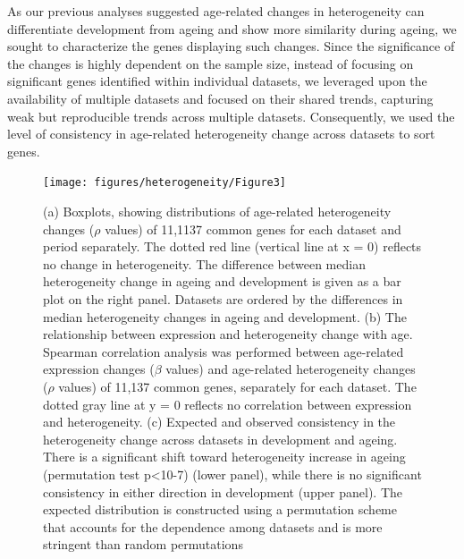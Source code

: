 \documentclass[12pt,twoside]{unicam}
\begin{document}
As our previous analyses suggested age-related changes in heterogeneity can differentiate development from ageing and show more similarity during ageing, we sought to characterize the genes displaying such changes. Since the significance of the changes is highly dependent on the sample size, instead of focusing on significant genes identified within individual datasets, we leveraged upon the availability of multiple datasets and focused on their shared trends, capturing weak but reproducible trends across multiple datasets. Consequently, we used the level of consistency in age-related heterogeneity change across datasets to sort genes.

\begin{figure}

{\centering \texttt{[image: figures/heterogeneity/Figure3]} 

}

\caption[a) Distriubtion of age-related change in gene expression heterogeneity across datasets, b) The relationship between the age-related change in gene expression level and heterogeneity, c) Consistency in the change in gene expression heterogeneity.]{(a) Boxplots, showing distributions of age-related heterogeneity changes ($\rho$ values) of 11,1137 common genes for each dataset and period separately. The dotted red line (vertical line at x = 0) reflects no change in heterogeneity. The difference between median heterogeneity change in ageing and development is given as a bar plot on the right panel. Datasets are ordered by the differences in median heterogeneity changes in ageing and development. (b) The relationship between expression and heterogeneity change with age. Spearman correlation analysis was performed between age-related expression changes ($\beta$ values) and age-related heterogeneity changes ($\rho$ values) of 11,137 common genes, separately for each dataset. The dotted gray line at y = 0 reflects no correlation between expression and heterogeneity. (c) Expected and observed consistency in the heterogeneity change across datasets in development and ageing. There is a significant shift toward heterogeneity increase in ageing (permutation test p<10-7) (lower panel), while there is no significant consistency in either direction in development (upper panel). The expected distribution is constructed using a permutation scheme that accounts for the dependence among datasets and is more stringent than random permutations}\label{fig:hetFig3}
\end{figure}
\end{document}
